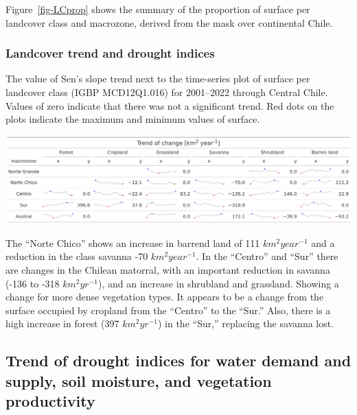 \documentclass[
  authoryear,
  preprint,
  3p,
  onecolumn]{elsarticle}
\begin{document}
Figure~\ref{fig-LCprop} shows the summary of the proportion of surface
per landcover class and macrozone, derived from the mask over
continental Chile.

\hypertarget{landcover-trend-and-drought-indices-1}{%
\subsubsection{Landcover trend and drought
indices}\label{landcover-trend-and-drought-indices-1}}

\begin{table}[!ht]
\caption{The value of Sen's slope trend next to the time-series plot of surface per landcover class (IGBP MCD12Q1.016) for 2001–2022 through Central Chile. Values of zero indicate that there was not a significant trend. Red dots on the plots indicate the maximum and minimum values of surface.}
\label{tab-landcoverTrend}
\includegraphics[]{../output/figs/table_var_landcover_macro.png}
\end{table}

The ``Norte Chico'' shows an increase in barrend land of 111
\(km^2 year^{-1}\) and a reduction in the class savanna -70
\(km^2 year^{-1}\). In the ``Centro'' and ``Sur'' there are changes in
the Chilean matorral, with an important reduction in savanna (-136 to
-318 \(km^2 yr^{-1}\)), and an increase in shrubland and grassland.
Showing a change for more dense vegetation types. It appears to be a
change from the surface occupied by cropland from the ``Centro'' to the
``Sur.'' Also, there is a high increase in forest (397 \(km^2 yr^{-1}\))
in the ``Sur,'' replacing the savanna lost.

\hypertarget{trend-of-drought-indices-for-water-demand-and-supply-soil-moisture-and-vegetation-productivity-1}{%
\subsection{Trend of drought indices for water demand and supply, soil
moisture, and vegetation
productivity}\label{trend-of-drought-indices-for-water-demand-and-supply-soil-moisture-and-vegetation-productivity-1}}
\end{document}
